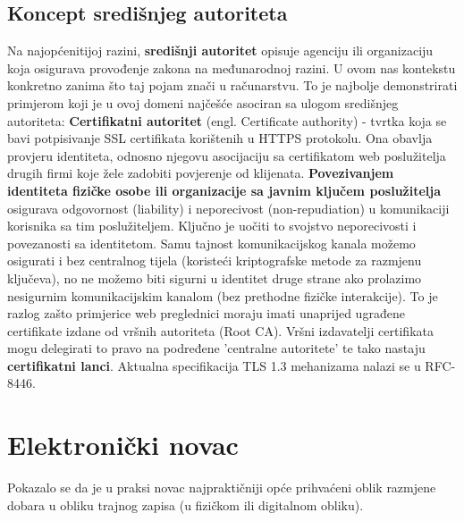 \documentclass[utf8, zavrsni]{fer}
\begin{document}
\section{Koncept središnjeg autoriteta}
Na najopćenitijoj razini, \textbf{središnji autoritet} opisuje agenciju ili organizaciju koja osigurava provođenje zakona na međunarodnoj razini. U ovom nas kontekstu konkretno zanima što taj pojam znači u računarstvu. To je najbolje demonstrirati primjerom koji je u ovoj domeni najčešće asociran sa ulogom središnjeg autoriteta: \textbf{Certifikatni autoritet} (engl. Certificate authority) - tvrtka koja se bavi potpisivanje SSL certifikata korištenih u HTTPS protokolu. Ona obavlja provjeru identiteta, odnosno njegovu asocijaciju sa certifikatom web poslužitelja drugih firmi koje žele zadobiti povjerenje od klijenata. \textbf{Povezivanjem identiteta fizičke osobe ili organizacije sa javnim ključem poslužitelja} osigurava odgovornost (liability) i neporecivost (non-repudiation) u komunikaciji korisnika sa tim poslužiteljem. Ključno je uočiti to svojstvo neporecivosti i povezanosti sa identitetom. Samu tajnost komunikacijskog kanala možemo osigurati i bez centralnog tijela (koristeći kriptografske metode za razmjenu ključeva), no ne možemo biti sigurni u identitet druge strane ako prolazimo nesigurnim komunikacijskim kanalom (bez prethodne fizičke interakcije). To je razlog zašto primjerice web preglednici moraju imati unaprijed ugrađene certifikate izdane od vršnih autoriteta (Root CA). Vršni izdavatelji certifikata mogu delegirati to pravo na podređene 'centralne autoritete' te tako nastaju \textbf{certifikatni lanci}. Aktualna specifikacija TLS 1.3 mehanizama nalazi se u RFC-8446.\\


\chapter{Elektronički novac}

Pokazalo se da je u praksi novac najpraktičniji opće prihvaćeni oblik razmjene dobara u obliku trajnog zapisa (u fizičkom ili digitalnom obliku).
\end{document}
